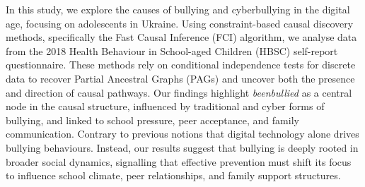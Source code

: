 \documentclass[main.tex]{subfiles}
\begin{document}
In this study, we explore the causes of bullying and cyberbullying in the digital age, focusing on adolescents in Ukraine. Using constraint-based causal discovery methods, specifically the Fast Causal Inference (FCI) algorithm, we analyse data from the 2018 Health Behaviour in School-aged Children (HBSC) self-report questionnaire. These methods rely on conditional independence tests for discrete data to recover Partial Ancestral Graphs (PAGs) and uncover both the presence and direction of causal pathways. Our findings highlight \textit{beenbullied} as a central node in the causal structure, influenced by traditional and cyber forms of bullying, and linked to school pressure, peer acceptance, and family communication. Contrary to previous notions that digital technology alone drives bullying behaviours. Instead, our results suggest that bullying is deeply rooted in broader social dynamics, signalling that effective prevention must shift its focus to influence school climate, peer relationships, and family support structures.
\end{document}
